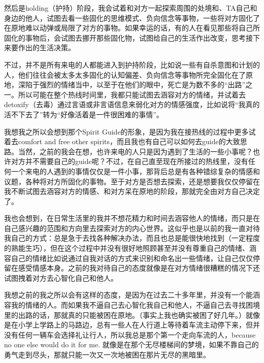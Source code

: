 然后是holding（护持）阶段，我会试着和对方一起探索周围的处境和、TA自己和身边的他人，试图去看一些固化的思维模式、负向信念等事物，一些将对方固化了在原地难以动弹或局限了对方的事物。如果幸运的话，有的人在看见那些将自己所固化的事物后，会试图去挪开那些固化物，试图给自己的生活作出改变，思考接下来要作出的生活决策。

不过，并不是所有来电的人都能进入到护持阶段，比如说一些有自杀意图和计划的人，他们往往会被太多太多固化的认知偏差、负向信念等事物所完全固化在了原地，深陷于强烈的情绪当中，以至于在他们的眼中，死亡是为数不多的“出路”之一。所以可能在整个热线时间里，我都只能试图去涵容对方的情绪，并试着去detoxify（去毒）\pozhehao{}通过言语或非言语信息来弱化对方的情感强度，比如说将“我真的活不下去了”转为“好像活着是一件很困难的事情”。

我想我之所以会想到那个Spirit Guide的形象，是因为我在接热线的过程中更多试着去comfort and free other spirits，而且我也有自己可以如何去guide的大致思路。当然，之前的我会在想，也许来电的人只是因为遇到了生活的一些小事呢？也许对方并不需要自己的guide呢？不过，在自己直至现在所接过的热线里，没有任何一个来电的人遇到的事情仅仅是一件小事，那背后总是有各种错综复杂的情感和议题，各种将对方所固化的事物。至于对方是否想去探索，还是想要我仅仅停留在我不断试图去涵容对方的情感、和对方呆在原地的阶段，那就完全由对方自己决定了。

我也会想到，在日常生活里的我并不想花精力和时间去涵容他人的情绪，而只是在自己感兴趣的范围和方向里去探索对方的内心世界。这似乎也是以前的我一直对待我自己的方式：总是急于去找各种解决办法，而且也总是能很快地找到（一定程度的熟能生巧），但在这个过程中并没有很好地照顾甚至并没有尊重自己的情绪、涵容自己的情绪\pozhehao{}比如说通过自我对话的方式来识别和命名出一些情绪，让自己仅仅停留在感受情感本身。之前的我对待自己的态度就像是在对方情绪很糟糕的情况下还试图拽着对方去心智化自己和他人。

我想之前的我之所以会有这样的态度，是因为在过去二十多年里，并没有一个能涵容我的情绪的人。而如果我不逼自己去心智化我自己和他人，不逼自己去寻找困境里的出路的话，那就真的只能被困在原地。（事实上我也确实被困了好几年。）就像是在小学上学路上的马路边，总有一些人在人行道上等待着车流主动停下来，但并没有任何一辆车会选择礼让行人，所以我总是那个第一个走向车流的人，because no one else would do it for me. 就像是在那个无尽楼梯间的梦境，如果不靠自己的勇气走到尽头，那就只能一次又一次地被困在那片无尽的黑暗里。
